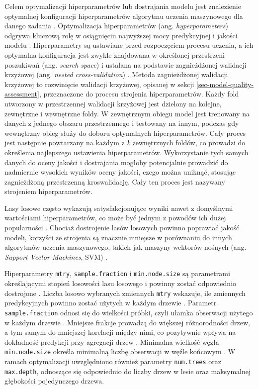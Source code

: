 \documentclass{amuthesis}
\begin{document}
Celem optymalizacji hiperparametrów lub dostrajania modelu jest
znalezienie optymalnej konfiguracji hiperparametrów algorytmu uczenia
maszynowego dla danego zadania \autocite{bischl_2024_mlr3}.
Optymalizacja hiperparametrów (ang. \emph{hyperparameters}) odgrywa
kluczową rolę w osiągnięciu najwyższej mocy predykcyjnej i jakości
modelu \autocite{schratz_2019_hyperparameters}. Hiperparametry są
ustawiane przed rozpoczęciem procesu uczenia, a ich optymalna
konfiguracja jest zwykle znajdowana w określonej przestrzeni poszukiwań
(ang. \emph{search space}) i ustalana na podstawie zagnieżdżonej
walidacji krzyżowej (ang. \emph{nested cross-validation})
\autocite{lovelace_2019_geocomputation}. Metoda zagnieżdżonej walidacji
krzyżowej to rozwinięcie walidacji krzyżowej, opisanej w sekcji
\ref{sec-model-quality-assessment}, przeznaczone do procesu strojenia
hiperparametrów. Każdy fold utworzony w przestrzennej walidacji
krzyżowej jest dzielony na kolejne, zewnętrzne i wewnętrzne foldy. W
zewnętrznym obiegu model jest trenowany na danych z jednego obszaru
przestrzennego i testowany na innym, podczas gdy wewnętrzny obieg służy
do doboru optymalnych hiperparametrów. Cały proces jest następnie
powtarzany na każdym z \emph{k} zewnętrznych foldów, co prowadzi do
określenia najlepszego ustawienia hiperparametrów. Wykorzystanie tych
samych danych do oceny jakości i dostrajania mogłoby potencjalnie
prowadzić do nadmiernie wysokich wyników oceny jakości, czego można
uniknąć, stosując zagnieżdżoną przestrzenną kroswalidację. Cały ten
proces jest nazywany strojeniem hiperparametrów.

Lasy losowe często wykazują satysfakcjonujące wyniki nawet z domyślnymi
wartościami hiperparametrów, co może być jednym z powodów ich dużej
popularności \autocite{lovelace_2019_geocomputation}. Chociaż
dostrojenie lasów losowych powinno poprawiać jakość modeli, korzyści ze
strojenia są znacznie mniejsze w porównaniu do innych algorytmów uczenia
maszynowego, takich jak maszyny wektorów nośnych (ang. \emph{Support
Vector Machines}, SVM) \autocite{probst_2019_hyperparameters}.

Hiperparametry \texttt{mtry}, \texttt{sample.fraction} i
\texttt{min.node.size} są parametrami określającymi stopień losowości
lasu losowego i powinny zostać odpowiednio dostrojone
\autocite{probst_2019_hyperparameters}. Liczba losowo wybranych
zmiennych \texttt{mtry} wskazuje, ile zmiennych predykcyjnych powinno
zostać użytych w każdym drzewie \autocite{lovelace_2019_geocomputation}.
Parametr \texttt{sample.fraction} odnosi się do wielkości próbki, czyli
ułamka obserwacji użytego w każdym drzewie
\autocite{lovelace_2019_geocomputation}. Mniejsze frakcje prowadzą do
większej różnorodności drzew, a tym samym do mniejszej korelacji między
nimi, co pozytywnie wpływa na dokładność predykcji przy agregacji drzew
\autocite{probst_2019_hyperparameters}. Minimalna wielkość węzła
\texttt{min.node.size} określa minimalną liczbę obserwacji w węźle
końcowym \autocite{probst_2019_hyperparameters}. W ramach optymalizacji
uwzględniono również parametry \texttt{num.trees} oraz
\texttt{max.depth}, odnoszące się odpowiednio do liczby drzew w lesie
oraz maksymalnej głębokości pojedynczego drzewa.
\end{document}
